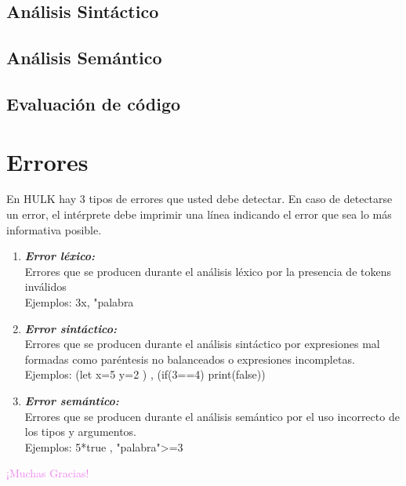 \documentclass[a4paper,12pt]{article}
\begin{document}
	 
	\subsection{Análisis Sintáctico}
	\subsection{Análisis Semántico}
	\subsection{Evaluación de código}
	
	\section{\color{red}Errores}
	
	  \begin{center}
		En HULK hay 3 tipos de errores que usted debe detectar. En caso de detectarse un error, el intérprete debe imprimir una línea indicando el error que sea lo más informativa posible.
	  \end{center}

    \renewcommand{\labelenumi}{$\bigstar$}
	\begin{enumerate}
		
		\color{red}
		\item \normalcolor \textbf{\textit{Error léxico:}}\\
		Errores que se producen durante el análisis léxico por la presencia de tokens inválidos\\
		Ejemplos: 3x, "palabra
		
		\color{red}
		\item \normalcolor \textbf{\textit{Error sintáctico:}}\\
		Errores que se producen durante el análisis sintáctico por expresiones mal formadas como paréntesis no balanceados o expresiones incompletas.\\
		Ejemplos: (let x=5 y=2 ) , (if(3==4) print(false))
		
		\color{red}
		\item \normalcolor \textbf{\textit{Error semántico:}}\\
		Errores que se producen durante el análisis semántico por el uso incorrecto de los tipos y argumentos.\\
		Ejemplos: 5*true , "palabra">=3
		
	
	\end{enumerate}
	  


	\begin{center}
		\Huge\textcolor{violet}{¡Muchas Gracias!}
	\end{center}
	
\end{document}
